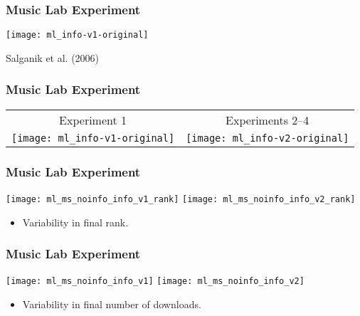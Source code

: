 \begin{frame}
  \frametitle{Music Lab Experiment}

    \texttt{[image: ml\_info-v1-original]}

    Salganik et al. (2006)
    \cite{salganik2006a}

\end{frame}

\begin{frame}
  \frametitle{Music Lab Experiment}

  \begin{tabular}{cc}
    Experiment 1 & Experiments 2--4 \\
    \texttt{[image: ml\_info-v1-original]} & 
    \texttt{[image: ml\_info-v2-original]} \\
  \end{tabular}




\end{frame}

\begin{frame}
  \frametitle{Music Lab Experiment}

  \texttt{[image: ml\_ms\_noinfo\_info\_v1\_rank]}
  \texttt{[image: ml\_ms\_noinfo\_info\_v2\_rank]}
  
  \begin{itemize}
  \item 
    Variability in final rank.
  \end{itemize}

\end{frame}

\begin{frame}
  \frametitle{Music Lab Experiment}

  \texttt{[image: ml\_ms\_noinfo\_info\_v1]}
  \texttt{[image: ml\_ms\_noinfo\_info\_v2]}
  
  \begin{itemize}
  \item 
    Variability in final number of downloads.
  \end{itemize}
  
\end{frame}




